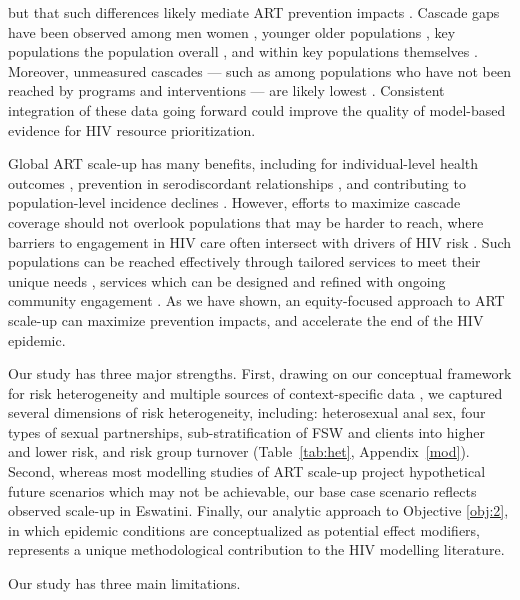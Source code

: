 but that such differences likely mediate ART prevention impacts \cite{Knight2022sr}.
Cascade gaps have been observed among men \vs women \cite{Quinn2019,Green2020},
younger \vs older populations \cite{Green2020,Lebelonyane2021},
key populations \vs the population overall \cite{Hakim2018},
and within key populations themselves \cite{Mayanja2018,Jaffer2022}.
Moreover, unmeasured cascades
--- such as among populations who have not been reached by programs and interventions ---
are likely lowest \cite{Hakim2018,Boothe2021}.
Consistent integration of these data going forward could
improve the quality of model-based evidence for HIV resource prioritization.
\par
Global ART scale-up has many benefits, including for
individual-level health outcomes \cite{Gabillard2013,Lundgren2015init},
prevention in serodiscordant relationships \cite{Cohen2016},
and contributing to population-level incidence declines \cite{Havlir2020}.
However, efforts to maximize cascade coverage should not overlook
populations that may be harder to reach,
where barriers to engagement in HIV care often intersect with drivers of HIV risk
\cite{Wanyenze2016,Schwartz2017,Schmidt-Sane2022,Camlin2019,Baral2019}.
Such populations can be reached effectively through
tailored services to meet their unique needs \cite{Ehrenkranz2019},
services which can be designed and refined with ongoing community engagement
\cite{Chikwari2018,Mlambo2019,Comins2022}.
As we have shown, an equity-focused approach to ART scale-up can maximize prevention impacts,
and accelerate the end of the HIV epidemic.
\par
Our study has three major strengths.
First, drawing on our conceptual framework for risk heterogeneity \cite[Table~1]{Knight2022sr}
and multiple sources of context-specific data
\cite{SDHS2006,SHIMS1,SHIMS2,Baral2014,EswKP2014,EswIBBS2022},
we captured several dimensions of risk heterogeneity, including:
heterosexual anal sex,
four types of sexual partnerships,
sub-stratification of FSW and clients into higher and lower risk,
and risk group turnover
(Table~\ref{tab:het}, Appendix~\ref{mod}).
Second, whereas most modelling studies of ART scale-up
project hypothetical future scenarios which may not be achievable,
our base case scenario reflects observed scale-up in Eswatini.
Finally, our analytic approach to Objective \ref{obj:2},
in which epidemic conditions are conceptualized as potential effect modifiers,
represents a unique methodological contribution to the HIV modelling literature.
\par
Our study has three main limitations.
